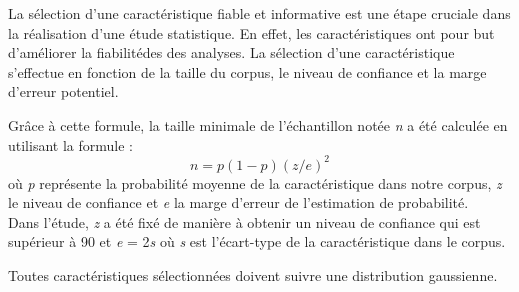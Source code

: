 \vspace{\baselineskip}
\hspace{0,5cm}La sélection d'une caractéristique fiable et informative est une étape cruciale
dans la réalisation d'une étude statistique. En effet, les caractéristiques ont
pour but d'améliorer la fiabilitédes des analyses. La sélection d'une
caractéristique s'effectue en fonction de la taille du corpus, le niveau de
confiance et la marge d'erreur potentiel. 

\hspace{0,5cm} Grâce à cette formule, la taille minimale de l'échantillon notée \textit{n} a
été calculée en utilisant la formule :
\[n=p(1-p)(z/e)^2\]
où \textit{p} représente la probabilité moyenne de la caractéristique dans notre
corpus, \textit{z} le niveau de confiance et \textit{e} la marge d'erreur de
l'estimation de probabilité.
\\Dans l'étude, \textit{z} a été fixé de manière à obtenir un niveau de confiance
qui est supérieur à 90 et \textit{e} = 2\textit{s} où \textit{s} est
l'écart-type de la caractéristique dans le corpus.

\hspace{0,5cm}Toutes caractéristiques sélectionnées doivent suivre une
distribution gaussienne.
